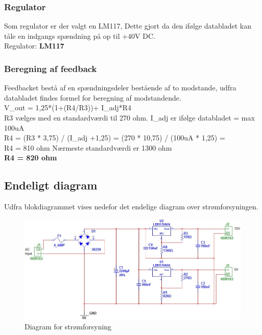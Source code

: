 \subsubsection{Regulator}
Som regulator er der valgt en LM117, Dette gjort da den ifølge databladet kan tåle en indgangs spændning på op til +40V DC. \\
Regulator: \textbf{LM117}
\subsubsection{Beregning af feedback}
Feedbacket bestå af en spændningsdeler bestående af to modstande, udfra databladet findes formel for beregning af modstandende. \\
V\_out = 1,25*(1+(R4/R3))+ I\_adj*R4 \\
R3 vælges med en standardværdi til 270 ohm. I\_adj er ifølge databladet = max 100uA \\
R4 = (R3 * 3,75) / (I\_adj +1,25) = (270 * 10,75) / (100uA * 1,25) = \\
R4 = 810 ohm
Nærmeste standardværdi er 1300 ohm \\
\textbf{R4 = 820 ohm}
\newpage
\subsection{Endeligt diagram}
Udfra blokdiagrammet vises nedefor det endelige diagram over strømforsyningen.
\begin{figure}[H]
\centering
\includegraphics[scale=0.7]{billeder/final_power}
\caption{Diagram for strømforsyning}
\label{fig:Dia_finalpower}
\end{figure}

